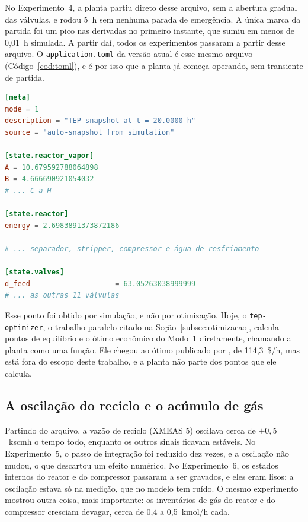No Experimento~4, a planta partiu direto desse arquivo, sem a abertura gradual das válvulas, e rodou 5~h sem nenhuma parada de emergência. A única marca da partida foi um pico nas derivadas no primeiro instante, que sumiu em menos de 0,01~h simulada. A partir daí, todos os experimentos passaram a partir desse arquivo. O \texttt{application.toml} da versão atual é esse mesmo arquivo (Código~\ref{cod:toml}), e é por isso que a planta já começa operando, sem transiente de partida.

\noindent\begin{minipage}{\linewidth}
\begin{lstlisting}[language=toml, caption={Trechos do \texttt{application.toml}, com o estado salvo no Experimento~3}, label={cod:toml}]
[meta]
mode = 1
description = "TEP snapshot at t = 20.0000 h"
source = "auto-snapshot from simulation"

[state.reactor_vapor]
A = 10.679592788064898
B = 4.666690921054032
# ... C a H

[state.reactor]
energy = 2.6983891373872186

# ... separador, stripper, compressor e água de resfriamento

[state.valves]
d_feed                    = 63.05263038999999
# ... as outras 11 válvulas
\end{lstlisting}
\end{minipage}

Esse ponto foi obtido por simulação, e não por otimização. Hoje, o \texttt{tep-optimizer}, o trabalho paralelo citado na Seção~\ref{subsec:otimizacao}, calcula pontos de equilíbrio e o ótimo econômico do Modo~1 diretamente, chamando a planta como uma função. Ele chegou ao ótimo publicado por , de 114,3~\$/h, mas está fora do escopo deste trabalho, e a planta não parte dos pontos que ele calcula.

\subsection{A oscilação do reciclo e o acúmulo de gás}
\label{subsec:exp_acumulo}

Partindo do arquivo, a vazão de reciclo (XMEAS 5) oscilava cerca de $\pm 0{,}5$~kscmh o tempo todo, enquanto os outros sinais ficavam estáveis. No Experimento~5, o passo de integração foi reduzido dez vezes, e a oscilação não mudou, o que descartou um efeito numérico. No Experimento~6, os estados internos do reator e do compressor passaram a ser gravados, e eles eram lisos: a oscilação estava só na medição, que no modelo tem ruído. O mesmo experimento mostrou outra coisa, mais importante: os inventários de gás do reator e do compressor cresciam devagar, cerca de 0,4 a 0,5~kmol/h cada.

